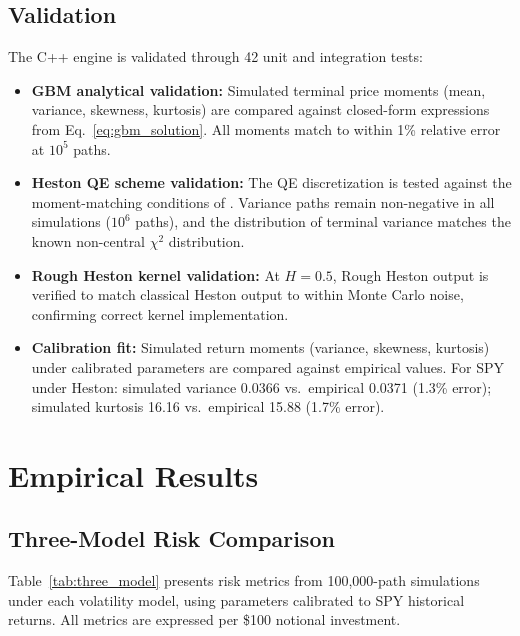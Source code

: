 \documentclass[11pt,a4paper]{article}
\begin{document}
\subsection{Validation}
\label{sec:validation}

The C++ engine is validated through 42 unit and integration tests:
\begin{itemize}[leftmargin=1.5em]
    \item \textbf{GBM analytical validation:} Simulated terminal price moments (mean, variance, skewness, kurtosis) are compared against closed-form expressions from Eq.~\eqref{eq:gbm_solution}. All moments match to within 1\% relative error at $10^5$ paths.
    \item \textbf{Heston QE scheme validation:} The QE discretization is tested against the moment-matching conditions of \citet{andersen2008}. Variance paths remain non-negative in all simulations ($10^6$ paths), and the distribution of terminal variance matches the known non-central $\chi^2$ distribution.
    \item \textbf{Rough Heston kernel validation:} At $H = 0.5$, Rough Heston output is verified to match classical Heston output to within Monte Carlo noise, confirming correct kernel implementation.
    \item \textbf{Calibration fit:} Simulated return moments (variance, skewness, kurtosis) under calibrated parameters are compared against empirical values. For SPY under Heston: simulated variance 0.0366 vs.\ empirical 0.0371 (1.3\% error); simulated kurtosis 16.16 vs.\ empirical 15.88 (1.7\% error).
\end{itemize}


\section{Empirical Results}
\label{sec:results}

\subsection{Three-Model Risk Comparison}
\label{sec:risk_comparison}

Table~\ref{tab:three_model} presents risk metrics from 100{,}000-path simulations under each volatility model, using parameters calibrated to SPY historical returns.
All metrics are expressed per \$100 notional investment.
\end{document}
